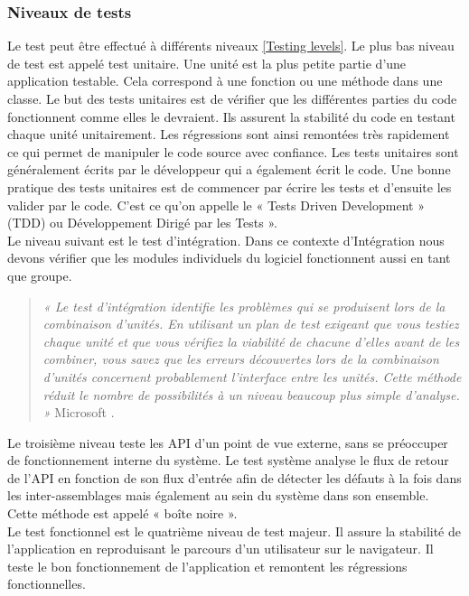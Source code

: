       \subsubsection{Niveaux de tests}
      Le test peut être effectué à différents niveaux \ref{Testing levels}. Le plus bas niveau de test est appelé test unitaire. Une unité est la plus petite partie d’une application testable. Cela correspond à une fonction ou une méthode dans une classe. Le but des tests unitaires est de vérifier que les différentes parties du code fonctionnent comme elles le devraient. Ils assurent la stabilité du code en testant chaque unité unitairement. Les régressions sont ainsi remontées très rapidement ce qui permet de manipuler le code source avec confiance. Les tests unitaires sont généralement écrits par le développeur qui a également écrit le code. Une bonne pratique des tests unitaires est de commencer par écrire les tests et d’ensuite les valider par le code. C’est ce qu’on appelle le « Tests Driven Development » (TDD) ou Développement Dirigé par les Tests ».\\

      Le niveau suivant est le test d'intégration. Dans ce contexte d’Intégration nous devons vérifier que les modules individuels du logiciel fonctionnent aussi en tant que groupe.\\

      \begin{quotation}
        \emph{« Le test d'intégration identifie les problèmes qui se produisent lors de la combinaison d'unités. En utilisant un plan de test exigeant que vous testiez chaque unité et que vous vérifiez la viabilité de chacune d'elles avant de les combiner, vous savez que les erreurs découvertes lors de la combinaison d'unités concernent probablement l'interface entre les unités. Cette méthode réduit le nombre de possibilités à un niveau beaucoup plus simple d'analyse. »} Microsoft \cite{Mic16}.\\
      \end{quotation}

      Le troisième niveau teste les API d’un point de vue externe, sans se préoccuper de fonctionnement interne du système. Le test système analyse le flux de retour de l’API en fonction de son flux d’entrée afin de détecter les défauts à la fois dans les inter-assemblages mais également au sein du système dans son ensemble. Cette méthode est appelé « boîte noire ».\\

       Le test fonctionnel est le quatrième niveau de test majeur. Il assure la stabilité de l’application en reproduisant le parcours d’un utilisateur sur le navigateur. Il teste le bon fonctionnement de l’application et remontent les régressions fonctionnelles.\\

